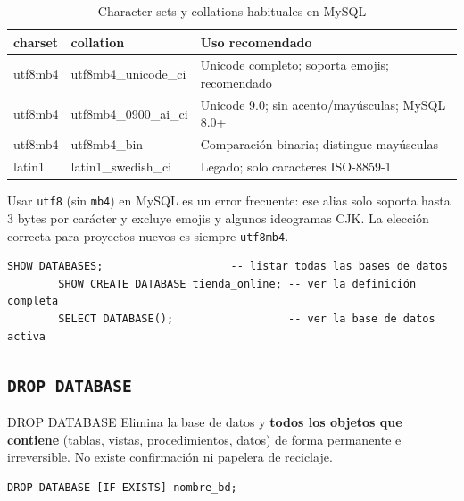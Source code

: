 \documentclass[12pt, a4paper]{article}
\begin{document}
	\begin{table}[H]
		\centering
		\caption{Character sets y collations habituales en MySQL}
		\renewcommand{\arraystretch}{1.3}
		\begin{tabularx}{\textwidth}{>{\ttfamily}l >{\ttfamily}l X}
			\toprule
			\textbf{charset}  & \textbf{collation}          & \textbf{Uso recomendado}                        \\
			\midrule
			utf8mb4  & utf8mb4\_unicode\_ci  & Unicode completo; soporta emojis; recomendado   \\
			utf8mb4  & utf8mb4\_0900\_ai\_ci & Unicode 9.0; sin acento/mayúsculas; MySQL 8.0+  \\
			utf8mb4  & utf8mb4\_bin          & Comparación binaria; distingue mayúsculas       \\
			latin1   & latin1\_swedish\_ci   & Legado; solo caracteres ISO-8859-1              \\
			\bottomrule
		\end{tabularx}
	\end{table}
	
	\begin{nota}
		Usar \texttt{utf8} (sin \texttt{mb4}) en MySQL es un error frecuente: ese
		alias solo soporta hasta 3 bytes por carácter y excluye emojis y algunos
		ideogramas CJK. La elección correcta para proyectos nuevos es siempre
		\texttt{utf8mb4}.
	\end{nota}
	
	\begin{lstlisting}[style=sql, caption={Comandos de exploración de bases de datos}]
		SHOW DATABASES;                    -- listar todas las bases de datos
		SHOW CREATE DATABASE tienda_online; -- ver la definición completa
		SELECT DATABASE();                  -- ver la base de datos activa
	\end{lstlisting}
	
	\subsection{\texttt{DROP DATABASE}}
	
	\begin{definicion}{DROP DATABASE}
		Elimina la base de datos y \textbf{todos los objetos que contiene}
		(tablas, vistas, procedimientos, datos) de forma permanente e
		irreversible. No existe confirmación ni papelera de reciclaje.
	\end{definicion}
	
	\begin{lstlisting}[style=sql, caption={Sintaxis de DROP DATABASE}]
		DROP DATABASE [IF EXISTS] nombre_bd;
	\end{lstlisting}
	
\end{document}
